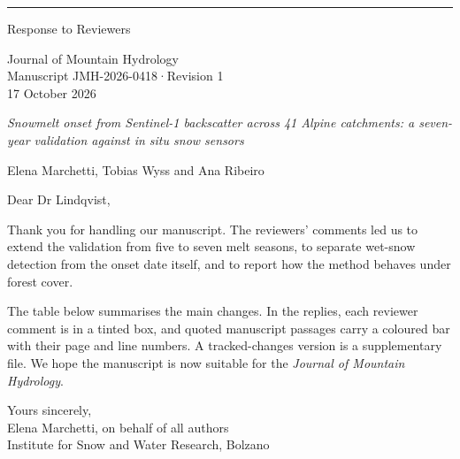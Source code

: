 \documentclass[10pt,a4paper]{article}
\newcommand\journal{Journal of Mountain Hydrology}
\newcommand\manuscriptid{JMH-2026-0418}
\newcommand\revisionno{Revision 1}
\newcommand\papertitle{Snowmelt onset from Sentinel-1 backscatter across 41 Alpine
  catchments: a seven-year validation against in situ snow sensors}
\newcommand\paperauthors{Elena Marchetti, Tobias Wyss and Ana Ribeiro}
\newcommand\letterdate{17 October 2026}
\newcounter{reviewer}
\begin{document}
{\color{accent}\rule{28pt}{2.4pt}}\par\vspace{6pt}
\begin{minipage}[b]{0.58\textwidth}
  {\fontsize{22}{26}\selectfont Response to Reviewers}
\end{minipage}\hfill
\begin{minipage}[b]{0.38\textwidth}\raggedleft
  \sffamily\footnotesize\color{muted}\linespread{1.25}\selectfont
  \journal\\ Manuscript \manuscriptid\enspace·\enspace\revisionno\\ \letterdate
\end{minipage}\par
\vspace{8pt}{\color{hair}\rule{\textwidth}{0.4pt}}\par\vspace{4pt}
{\itshape \papertitle}\par\vspace{-4pt}
{\small\color{muted}\paperauthors}\par
\vspace{0.6\baselineskip}

Dear Dr Lindqvist,

Thank you for handling our manuscript. The reviewers' comments led us to extend
the validation from five to seven melt seasons, to separate wet-snow detection
from the onset date itself, and to report how the method behaves under forest
cover.

The table below summarises the main changes. In the replies, each reviewer
comment is in a tinted box, and quoted manuscript passages carry a coloured bar
with their page and line numbers. A tracked-changes version is a supplementary
file. We hope the manuscript is now suitable for the \emph{\journal}.

Yours sincerely,\\[2pt]
Elena Marchetti, on behalf of all authors\\
{\small\color{muted}Institute for Snow and Water Research, Bolzano}

\end{document}
